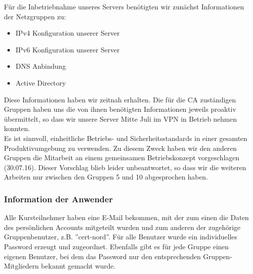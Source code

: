 Für die Inbetriebnahme unseres Servers benötigten wir zunächst Informationen der Netzgruppen zu:
\begin{itemize}
\item IPv4 Konfiguration unserer Server
\item IPv6 Konfiguration unserer Server
\item DNS Anbindung
\item Active Directory
\end{itemize}
Diese Informationen haben wir zeitnah erhalten. Die für die CA zuständigen Gruppen haben uns die von ihnen benötigten Informationen jeweils proaktiv übermittelt, so dass wir unsere Server Mitte Juli im VPN in Betrieb nehmen konnten.\\

Es ist sinnvoll, einheitliche Betriebs- und Sicherheitsstandards in einer gesamten Produktivumgebung zu verwenden. Zu diesem Zweck haben wir den anderen Gruppen die Mitarbeit an einem gemeinsamen Betriebskonzept vorgeschlagen (30.07.16). Dieser Vorschlag blieb leider unbeantwortet, so dass wir die weiteren Arbeiten nur zwischen den Gruppen 5 und 10 abgesprochen haben.

\subsubsection{Information der Anwender}
Alle Kursteilnehmer haben eine E-Mail bekommen, mit der zum einen die Daten des
persönlichen Accounts mitgeteilt wurden und zum anderen der zugehörige
Gruppenbenutzer, z.B. ''cert-nord''. Für alle Benutzer wurde ein individuelles
Password erzeugt und zugeordnet. Ebenfalls gibt es für jede Gruppe einen
eigenen Benutzer, bei dem das Password nur den entsprechenden
Gruppen-Mitgliedern bekannt gemacht wurde.\\

